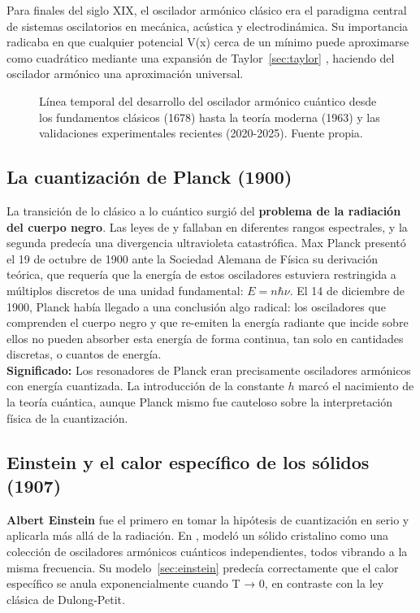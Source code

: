 \documentclass[11pt,a4paper,spanish]{book}
\begin{document}
Para finales del siglo XIX, el oscilador armónico clásico era el paradigma central de sistemas oscilatorios en mecánica, acústica y electrodinámica. Su importancia radicaba en que cualquier potencial V(x) cerca de un mínimo puede aproximarse como cuadrático mediante una expansión de Taylor~\ref{sec:taylor} , haciendo del oscilador armónico una aproximación universal.\\

\begin{figure}[h]
    \centering
    
    \caption{Línea temporal del desarrollo del oscilador armónico cuántico desde los fundamentos clásicos (1678) hasta la teoría moderna (1963) y las validaciones experimentales recientes (2020-2025). Fuente propia.}
    \label{fig:timeline_oac}
\end{figure}


\subsection*{La cuantización de Planck (1900)}
La transición de lo clásico a lo cuántico surgió del \textbf{problema de la radiación del cuerpo negro}. Las leyes de \cite{wien1896} y \cite{rayleigh1900, jeans1905} fallaban en diferentes rangos espectrales, y la segunda predecía una divergencia ultravioleta catastrófica. Max Planck presentó  el 19 de octubre de 1900 ante la Sociedad Alemana de Física \citep{planck1901} su derivación teórica, que requería que la energía de estos osciladores estuviera restringida a múltiplos discretos de una unidad fundamental: $E = n\hbar\nu$. El 14 de diciembre de 1900, Planck había llegado a una conclusión algo radical: los osciladores que comprenden el cuerpo negro y que re-emiten la energía radiante que incide sobre ellos no pueden absorber esta energía de forma continua, tan solo en cantidades discretas, o cuantos de energía.\\

\textbf{Significado:} Los resonadores de Planck eran precisamente osciladores armónicos con energía cuantizada. La introducción de la constante $h$ marcó el nacimiento de la teoría cuántica, aunque Planck mismo fue cauteloso sobre la interpretación física de la cuantización.



\subsection*{Einstein y el calor específico de los sólidos (1907)}
\textbf{Albert Einstein} fue el primero en tomar la hipótesis de cuantización en serio y aplicarla más allá de la radiación. En \cite{einstein1907}, modeló un sólido cristalino como una colección de osciladores armónicos cuánticos independientes, todos vibrando a la misma frecuencia. Su modelo~\ref{sec:einstein} predecía correctamente que el calor específico se anula exponencialmente cuando T → 0, en contraste con la ley clásica de Dulong-Petit.
\end{document}
